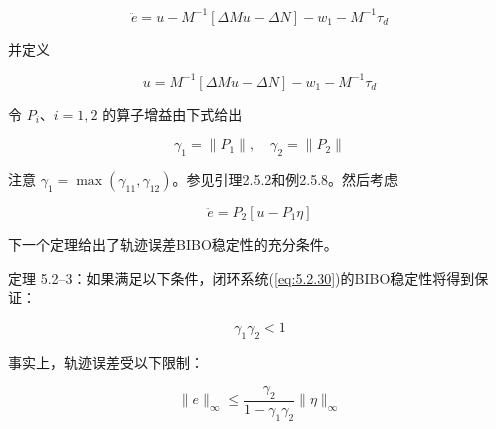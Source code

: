 \documentclass[UTF8,12pt,a4paper]{ctexart}
\begin{document}
\begin{equation}\label{eq:5.2.30}
\ddot{e} = u - M^{-1}[\Delta M u - \Delta N] - w_1 - M^{-1}\tau_d
\end{equation}

并定义

\begin{equation}\label{eq:5.2.31}
u = M^{-1}[\Delta M u - \Delta N] - w_1 - M^{-1}\tau_d
\end{equation}

令 $P_i$、$i = 1, 2$ 的算子增益由下式给出

\begin{equation}\label{eq:5.2.32}
\gamma_1 = \|P_1\|, \quad \gamma_2 = \|P_2\|
\end{equation}

注意 $\gamma_1 = \max(\gamma_{11}, \gamma_{12})$。参见引理2.5.2和例2.5.8。然后考虑

\begin{equation}\label{eq:5.2.33}
\ddot{e} = P_2[u - P_1\eta]
\end{equation}

下一个定理给出了轨迹误差BIBO稳定性的充分条件。

\begin{theorem}\label{thm:5.2.3}
定理 5.2--3：如果满足以下条件，闭环系统(\ref{eq:5.2.30})的BIBO稳定性将得到保证：

\begin{equation}
\gamma_1\gamma_2 < 1
\end{equation}

事实上，轨迹误差受以下限制：

\begin{equation}
\|e\|_\infty \leq \frac{\gamma_2}{1 - \gamma_1\gamma_2}\|\eta\|_\infty
\end{equation}
\end{theorem}
\end{document}
